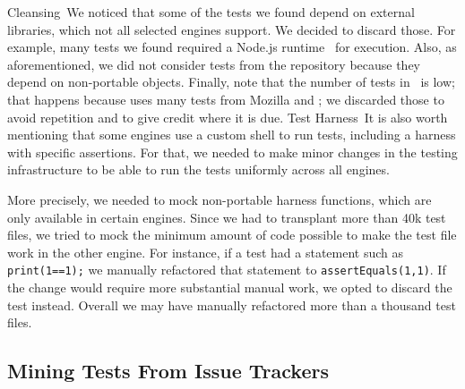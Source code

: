 \documentclass[smallextended]{svjour3}
\begin{document}

\lbrack{}Cleansing\rbrack{}~We noticed that some of the tests we found
depend on external libraries, which not all selected engines
support. We decided to discard those. For example, many tests we found
required a Node.js runtime~\cite{node} for execution. Also, as aforementioned,
we did not consider tests from the \chakra{} repository because they depend on
non-portable objects.
Finally, note that the number of tests in
\veight\ is low; that happens because \veight{} uses many tests from
Mozilla and \jsc; we discarded those to avoid repetition and to give
credit where it is due. \lbrack{}Test Harness\rbrack{}~It is also
worth mentioning that some engines use a custom shell to run tests,
including a harness with specific assertions.  For that, we needed to
make minor changes in the testing infrastructure to be able to run the
tests uniformly across all engines.

More precisely, we needed to mock
non-portable harness functions, which are only available in certain
engines. Since we had to transplant more than 40k test files,
we tried to mock the minimum amount of code possible to
make the test file work in the other engine.
For instance, if a test had a statement such as \texttt{print(1==1);}
we manually refactored that statement to \texttt{assertEquals(1,1)}.
If the change would require more substantial manual work, we opted to
discard the test instead. Overall we may have manually refactored more
than a thousand test files.

\subsection{Mining Tests From Issue Trackers}


\end{document}
